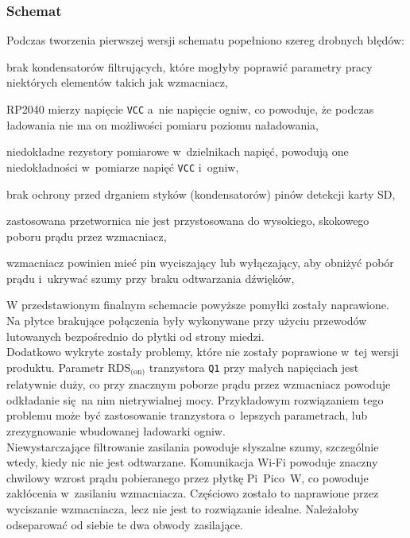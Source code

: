 \documentclass[polish]{aghengthesis}
\let\tempone\itemize
\let\temptwo\enditemize
\renewenvironment{itemize}{\tempone\setlength{\itemsep}{0cm}}{\temptwo}
\begin{document}
			\subsubsection{Schemat}
				\noindent
				Podczas tworzenia pierwszej wersji schematu popełniono szereg drobnych błędów:
				\begin{itemize}
					\item brak kondensatorów filtrujących, które mogłyby poprawić parametry pracy niektórych elementów takich jak wzmacniacz,
					\item RP2040 mierzy napięcie \lstinline|VCC| a~nie napięcie ogniw, co powoduje, że podczas ładowania nie ma on możliwości pomiaru poziomu naładowania,
					\item niedokładne rezystory pomiarowe w~dzielnikach napięć, powodują one niedokładności w~pomiarze napięć \lstinline|VCC| i~ogniw,
					\item brak ochrony przed drganiem styków (kondensatorów) pinów detekcji karty SD,
					\item zastosowana przetwornica nie jest przystosowana do wysokiego, skokowego poboru prądu przez wzmacniacz,
					\item wzmacniacz powinien mieć pin wyciszający lub wyłączający, aby obniżyć pobór prądu i~ukrywać szumy przy braku odtwarzania dźwięków,
				\end{itemize}
				
				W przedstawionym finalnym schemacie powyższe pomyłki zostały naprawione. Na płytce brakujące połączenia były wykonywane przy użyciu przewodów lutowanych bezpośrednio do płytki od strony miedzi.
				$ $\\
				
				Dodatkowo wykryte zostały problemy, które nie zostały poprawione w~tej wersji produktu. Parametr $\text{RDS}_{\text{(on)}}$ tranzystora \lstinline|Q1| przy małych napięciach jest relatywnie duży, co przy znacznym poborze prądu przez wzmacniacz powoduje odkładanie się na nim nietrywialnej mocy. Przykładowym rozwiązaniem tego problemu może być zastosowanie tranzystora o~lepszych parametrach, lub zrezygnowanie wbudowanej ładowarki ogniw.
				$ $\\
				
				Niewystarczające filtrowanie zasilania powoduje słyszalne szumy, szczególnie wtedy, kiedy nic nie jest odtwarzane. Komunikacja Wi-Fi powoduje znaczny chwilowy wzrost prądu pobieranego przez płytkę Pi~Pico~W, co powoduje zakłócenia w~zasilaniu wzmacniacza. Częściowo zostało to naprawione przez wyciszanie wzmacniacza, lecz nie jest to rozwiązanie idealne. Należałoby odseparować od siebie te dwa obwody zasilające.
				
\end{document}
